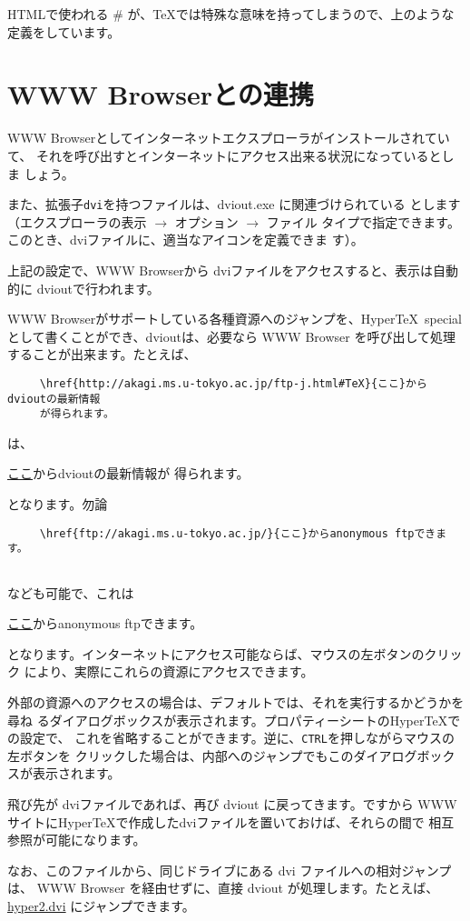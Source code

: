 HTMLで使われる \# が、\TeX では特殊な意味を持ってしまうので、上のような
定義をしています。

\section{WWW Browserとの連携}
WWW Browserとしてインターネットエクスプローラがインストールされていて、
それを呼び出すとインターネットにアクセス出来る状況になっているとしま
しょう。

また、拡張子{\tt dvi}を持つファイルは、dviout.exe に関連づけられている
とします（エクスプローラの表示 $\rightarrow$ オプション $\rightarrow$ ファイル
タイプで指定できます。このとき、dviファイルに、適当なアイコンを定義できま
す）。

上記の設定で、WWW Browserから dviファイルをアクセスすると、表示は自動的に
dvioutで行われます。

WWW Browserがサポートしている各種資源へのジャンプを、Hyper\TeX\ special
として書くことができ、dvioutは、必要なら WWW Browser を呼び出して処理
することが出来ます。たとえば、
\begin{verbatim}
     \href{http://akagi.ms.u-tokyo.ac.jp/ftp-j.html#TeX}{ここ}からdvioutの最新情報
     が得られます。
\end{verbatim}
は、
\medskip

\noindent
\href{http://akagi.ms.u-tokyo.ac.jp/ftp-j.html#TeX}{ここ}からdvioutの最新情報が
得られます。
\medskip

\noindent
となります。勿論
\begin{verbatim}
     \href{ftp://akagi.ms.u-tokyo.ac.jp/}{ここ}からanonymous ftpできます。
 
\end{verbatim}
なども可能で、これは
\medskip

\noindent
\href{ftp://akagi.ms.u-tokyo.ac.jp/}{ここ}からanonymous ftpできます。
\medskip

\noindent
となります。インターネットにアクセス可能ならば、マウスの左ボタンのクリック
により、実際にこれらの資源にアクセスできます。

外部の資源へのアクセスの場合は、デフォルトでは、それを実行するかどうかを尋ね
るダイアログボックスが表示されます。プロパティーシートのHyper\TeX での設定で、
これを省略することができます。逆に、{\tt CTRL}を押しながらマウスの左ボタンを
クリックした場合は、内部へのジャンプでもこのダイアログボックスが表示されます。
\medskip

飛び先が dviファイルであれば、再び dviout に戻ってきます。ですから
WWWサイトにHyper\TeX で作成したdviファイルを置いておけば、それらの間で
相互参照が可能になります。
\medskip

なお、このファイルから、同じドライブにある dvi ファイルへの相対ジャンプは、
WWW Browser を経由せずに、直接 dviout が処理します。たとえば、
\href{file:hyper2.dvi#jump}{hyper2.dvi}
にジャンプできます。


